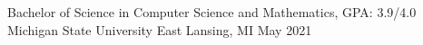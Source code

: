 
\begin{cventries}
  \cventry
    {Bachelor of Science in Computer Science and Mathematics, GPA: 3.9/4.0} %
    {Michigan State University} %
    {East Lansing, MI} %
    {May 2021} %
    {
    }
\end{cventries}